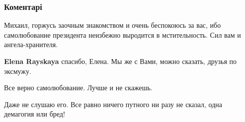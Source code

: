  
 
 
 
 
\subsubsection{Коментарі}
\label{sec:25_08_2021.fb.pogrebinskij_mihail.1.vzgljad_zelenskii_rechj_parad.cmt}

\begin{itemize}
 

Михаил, горжусь заочным знакомством и очень беспокоюсь за вас, ибо
самолюбование президента неизбежно выродится в мстительность. Сил вам и
ангела-хранителя.

\begin{itemize}
 
\textbf{Elena Rayskaya} спасибо, Елена. Мы же с Вами, можно сказать, друзья по эксмужу.

 
Все верно самолюбование. Лучше и не скажешь.
\end{itemize}

 
Даже не слушаю его. Все равно ничего путного ни разу не сказал, одна демагогия или бред!


\end{itemize}
